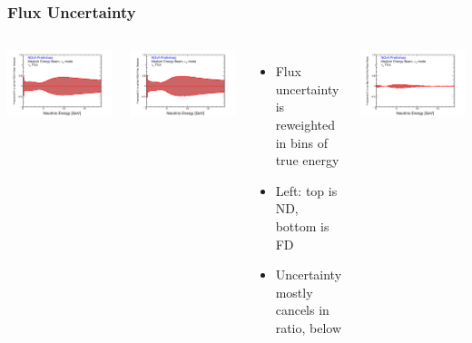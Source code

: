 \documentclass[10pt,professionalfonts,xcolor=table]{beamer}
\begin{document}
\begin{frame}
\frametitle{Flux Uncertainty}
\begin{columns}[b]
\includegraphics[width=1\textwidth]{figures/systs/params/beam_had_band_nd.pdf}

\includegraphics[width=1\textwidth]{figures/systs/params/beam_had_band_fd.pdf}
\begin{itemize}
\item Flux uncertainty is reweighted in bins of true energy
\item Left: top is ND, bottom is FD
\item Uncertainty mostly cancels in ratio, below
\end{itemize}
\gap
\gap
\includegraphics[width=1\textwidth]{figures/systs/params/beam_had_band_fd_nd_ratio.pdf}


\end{columns}
\end{frame}
\end{document}
